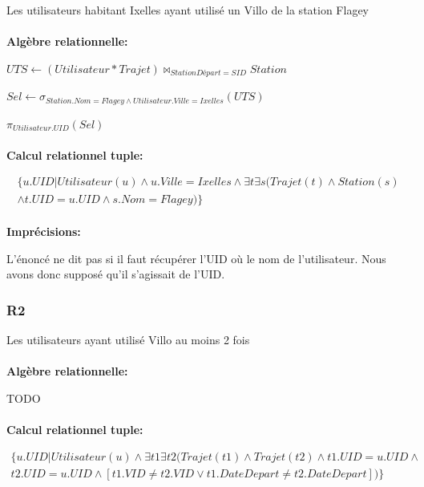 \documentclass[a4paper, 12pt]{report}
\begin{document}
Les utilisateurs habitant Ixelles ayant utilisé un Villo de la station Flagey
\paragraph{}
\textbf{Algèbre relationnelle:}

$UTS\leftarrow (Utilisateur * Trajet)\bowtie_{StationDépart=SID} Station$

$Sel\leftarrow \sigma_{Station.Nom=Flagey\wedge Utilisateur.Ville=Ixelles}(UTS)$

$\pi_{Utilisateur.UID}(Sel)$
\paragraph{}
\textbf{Calcul relationnel tuple:}

\begin{multline*}
\{  u.UID | Utilisateur(u)\wedge u.Ville=Ixelles \wedge \exists t \exists s ( Trajet(t)\wedge Station(s) \\\wedge t.UID=u.UID \wedge s.Nom=Flagey)   \} 
\end{multline*}

\paragraph{}
\textbf{Imprécisions:}

L'énoncé ne dit pas si il faut récupérer l'UID où le nom de l'utilisateur. Nous avons donc supposé qu'il s'agissait de l'UID.

\subsubsection*{R2}

Les utilisateurs ayant utilisé Villo au moins 2 fois
\paragraph{}
\textbf{Algèbre relationnelle:}

TODO %

\paragraph{}
\textbf{Calcul relationnel tuple:}

\begin{multline*}
\{ u.UID|Utilisateur(u)\wedge\exists t1\exists t2 ( Trajet(t1)\wedge Trajet(t2)\wedge t1.UID=u.UID\wedge \\
t2.UID=u.UID \wedge [t1.VID\neq t2.VID\vee t1.DateDepart\neq t2.DateDepart] )  \}
\end{multline*}
\end{document}
